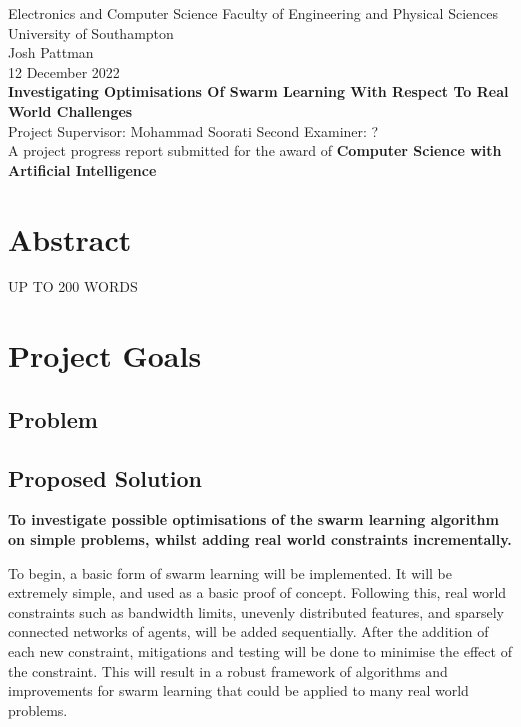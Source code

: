 \documentclass[12pt,a4paper,titlepage]{report}
\begin{document}
	\begin{titlepage}
		\centering\Large{Electronics and Computer Science Faculty of Engineering and Physical Sciences University of Southampton}
		\\[3cm]
		\centering\Large{Josh Pattman} \\
		\centering\Large{12 December 2022} \\
		\centering\huge\textbf{Investigating Optimisations Of Swarm Learning With Respect To Real World Challenges}
		\\[3cm]
		\centering\Large{Project Supervisor: Mohammad Soorati}
		\centering\Large{Second Examiner: ?}
		\\[3cm]
		\centering\huge{A project progress report submitted for the award of \textbf{Computer Science with Artificial Intelligence}}
	\end{titlepage}


	\chapter*{Abstract}
	UP TO 200 WORDS

	\tableofcontents
	
	
	\chapter{Project Goals}
	\section{Problem}
	\section{Proposed Solution}
	\textbf{To investigate possible optimisations of the swarm learning algorithm on simple problems, whilst adding real world constraints incrementally.}
	
	To begin, a basic form of swarm learning will be implemented. It will be extremely simple, and used as a basic proof of concept. Following this, real world constraints such as bandwidth limits, unevenly distributed features, and sparsely connected networks of agents, will be added sequentially. After the addition of each new constraint, mitigations and testing will be done to minimise the effect of the constraint. This will result in a robust framework of algorithms and improvements for swarm learning that could be applied to many real world problems.
	
\end{document}
